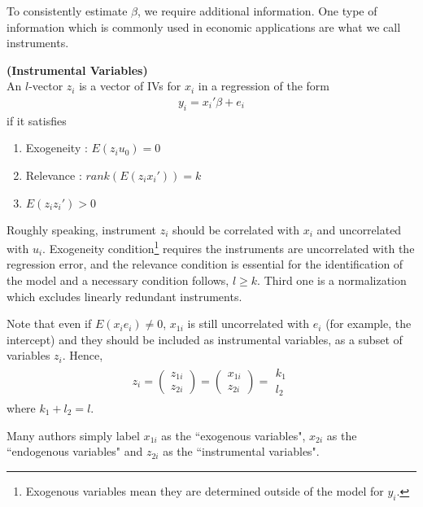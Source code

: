 \documentclass[11pt]{article} %
\theoremstyle{definition}
\numberwithin{defn}{subsection}
\numberwithin{thm}{subsection}
\numberwithin{ex}{subsection}
\begin{document}
To consistently estimate $\beta$, we require additional information. One type of information which is commonly used in economic applications are what we call instruments.

\begin{defn}
	\textbf{(Instrumental Variables)}\\
	An $l$-vector $z_i$ is a vector of IVs for $x_i$ in a regression of the form
	\begin{align*}
	y_i=x_i'\beta+e_i
	\end{align*}
	if it satisfies
	\begin{enumerate}
		\item Exogeneity : $E(z_iu_0)=0$
		\item Relevance : $rank(E(z_ix_i'))=k$
		\item $E(z_iz_i')>0$
	\end{enumerate}
\end{defn}

Roughly speaking, instrument $z_i$ should be correlated with $x_i$ and uncorrelated with $u_i$. Exogeneity condition\footnote{Exogenous variables mean they are determined outside of the model for $y_i$.} requires the instruments are uncorrelated with the regression error, and the relevance condition is essential for the identification of the model and a necessary condition follows, $l\ge k$. Third one is a normalization which excludes linearly redundant instruments.

Note that even if $E(x_ie_i)\neq0$, $x_{1i}$ is still uncorrelated with $e_i$ (for example, the intercept) and they should be included as instrumental variables, as a subset of variables $z_i$. Hence,
\begin{align*}
z_i=\begin{pmatrix}z_{1i}\\z_{2i}\end{pmatrix}=\begin{pmatrix}x_{1i}\\z_{2i}\end{pmatrix}=\begin{matrix}k_1\\l_2\end{matrix}
\end{align*}
where $k_1+l_2=l$. 

Many authors simply label $x_{1i}$ as the ``exogenous variables", $x_{2i}$ as the ``endogenous variables" and $z_{2i}$ as the ``instrumental variables".
\end{document}
